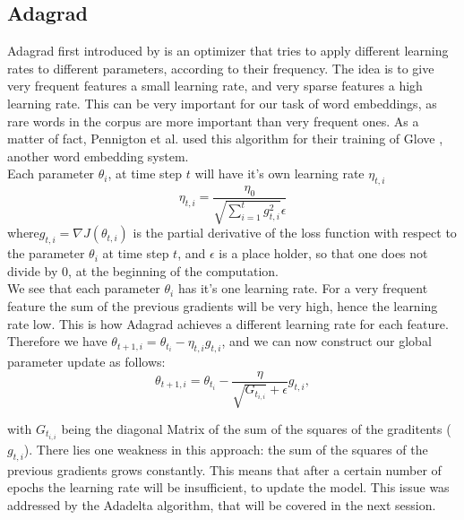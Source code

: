 \subsection{Adagrad}\label{ssec:adagrad}
Adagrad first introduced by \cite{adagrad} is an optimizer that tries to apply different learning rates to different parameters, according to their frequency. The idea is to give very frequent features a small learning rate, and very sparse features a high learning rate. This can be very important for our task of word embeddings, as rare words in the corpus are more important than very frequent ones. As a matter of fact, Pennigton et al. used this algorithm for their training of Glove \cite{Glove}, another word embedding system. \\
Each parameter $\theta_i$, at time step $t$ will have it's own learning rate $\eta_{t,i}$
 \begin{equation}
\eta_{t,i} = \frac{\eta_0}{\sqrt{\sum^{t}_{i=1} g^{2}_{t,i}} \epsilon}
\end{equation}
where$g_{t,i} = \nabla J(\theta_{t,i})$  is the partial derivative of the loss function with respect to the parameter $\theta_i$ at time step $t$, and $\epsilon$ is a place holder, so that one does not divide by $0$, at the beginning of the computation.\\ We see that each parameter $\theta_{i}$ has it's one learning rate. For a very frequent feature the sum of the previous gradients will be very high, hence the learning rate low. This is how Adagrad achieves a different learning rate for each feature. 
Therefore we have $ \theta_{t+1,i} = \theta_{t_i} - \eta_{t,i} g_{t,i} $, and we can now construct our global parameter update as follows: 
\begin{equation}
\theta_{t+1,i} = \theta_{t_i}- \frac{\eta}{\sqrt{G_{t_{i,i}}} + \epsilon} g_{t,i}, 
\end{equation} 

with  $G_{t_{i,i}}$ being the diagonal Matrix of the sum of the squares of the graditents ($g_{t,i} $). 
There lies one weakness in this approach: the sum of the squares of the previous gradients grows constantly. This means that after a certain number of epochs the learning rate will be insufficient, to update the model. This issue was addressed by the Adadelta algorithm, that will be covered in the next session. 

